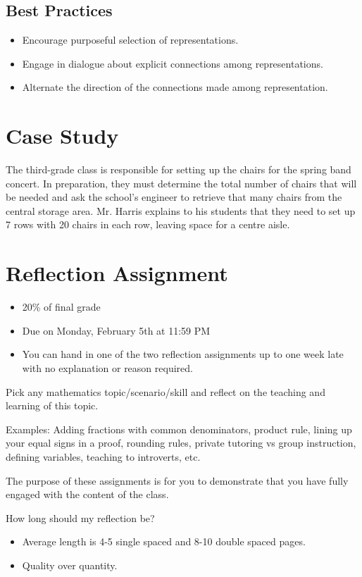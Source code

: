 \documentclass[11pt]{article}
\theoremstyle{theorem}\newtheorem*{task}{Task}
\theoremstyle{theorem}\newtheorem*{example}{Example}
\theoremstyle{theorem}\newtheorem*{answer}{Answer}
\theoremstyle{definition}\newtheorem*{solution}{Solution}
\theoremstyle{theorem}\newtheorem*{prompt}{Prompt}
\theoremstyle{theorem}\newtheorem*{question}{Question}
\begin{document}
\subsection{Best Practices}
\begin{itemize}
    \item Encourage purposeful selection of representations.
    \item Engage in dialogue about explicit connections among representations.
    \item Alternate the direction of the connections made among representation.
\end{itemize}

\section{Case Study}

The third-grade class is responsible for setting up the chairs for the spring band concert. In preparation, they must determine the total number of chairs that will be needed and ask the school's engineer to retrieve that many chairs from the central storage area. Mr. Harris explains to his students that they need to set up 7 rows with 20 chairs in each row, leaving space for a centre aisle.

\section{Reflection Assignment}
\begin{itemize}
    \item 20\% of final grade
    \item Due on Monday, February 5th at 11:59 PM
    \item You can hand in one of the two reflection assignments up to one week late with no explanation or reason required.
\end{itemize}

Pick any mathematics topic/scenario/skill and reflect on the teaching and learning of this topic.

Examples: Adding fractions with common denominators, product rule, lining up your equal signs in a proof, rounding rules, private tutoring vs group instruction, defining variables, teaching to introverts, etc.

The purpose of these assignments is for you to demonstrate that you have fully engaged with the content of the class.

How long should my reflection be?
\begin{itemize}
    \item Average length is 4-5 single spaced and 8-10 double spaced pages.
    \item Quality over quantity.
\end{itemize}
\end{document}
